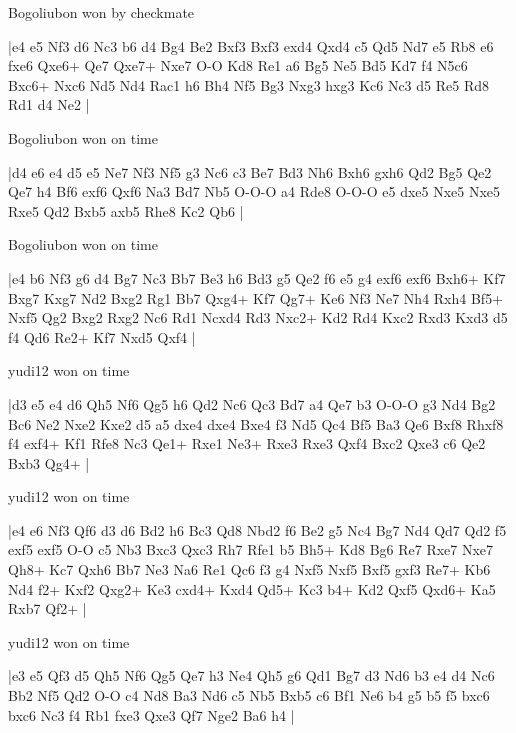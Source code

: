 Bogoliubon won by checkmate

\makegametitle
|e4 e5 Nf3 d6 Nc3 b6 d4 Bg4 Be2 Bxf3 Bxf3 exd4 Qxd4 c5 Qd5 Nd7 e5 Rb8 e6 fxe6 Qxe6+ Qe7 Qxe7+ Nxe7 O-O Kd8 Re1 a6 Bg5 Ne5 Bd5 Kd7 f4 N5c6 Bxc6+ Nxc6 Nd5 Nd4 Rac1 h6 Bh4 Nf5 Bg3 Nxg3 hxg3 Kc6 Nc3 d5 Re5 Rd8 Rd1 d4 Ne2  |

\showboard

Bogoliubon won on time

\makegametitle
|d4 e6 e4 d5 e5 Ne7 Nf3 Nf5 g3 Nc6 c3 Be7 Bd3 Nh6 Bxh6 gxh6 Qd2 Bg5 Qe2 Qe7 h4 Bf6 exf6 Qxf6 Na3 Bd7 Nb5 O-O-O a4 Rde8 O-O-O e5 dxe5 Nxe5 Nxe5 Rxe5 Qd2 Bxb5 axb5 Rhe8 Kc2 Qb6  |

\showboard

Bogoliubon won on time

\makegametitle
|e4 b6 Nf3 g6 d4 Bg7 Nc3 Bb7 Be3 h6 Bd3 g5 Qe2 f6 e5 g4 exf6 exf6 Bxh6+ Kf7 Bxg7 Kxg7 Nd2 Bxg2 Rg1 Bb7 Qxg4+ Kf7 Qg7+ Ke6 Nf3 Ne7 Nh4 Rxh4 Bf5+ Nxf5 Qg2 Bxg2 Rxg2 Nc6 Rd1 Ncxd4 Rd3 Nxc2+ Kd2 Rd4 Kxc2 Rxd3 Kxd3 d5 f4 Qd6 Re2+ Kf7 Nxd5 Qxf4  |

\showboard

yudi12 won on time

\makegametitle
|d3 e5 e4 d6 Qh5 Nf6 Qg5 h6 Qd2 Nc6 Qc3 Bd7 a4 Qe7 b3 O-O-O g3 Nd4 Bg2 Bc6 Ne2 Nxe2 Kxe2 d5 a5 dxe4 dxe4 Bxe4 f3 Nd5 Qc4 Bf5 Ba3 Qe6 Bxf8 Rhxf8 f4 exf4+ Kf1 Rfe8 Nc3 Qe1+ Rxe1 Ne3+ Rxe3 Rxe3 Qxf4 Bxc2 Qxe3 c6 Qe2 Bxb3 Qg4+  |

\showboard

yudi12 won on time

\makegametitle
|e4 e6 Nf3 Qf6 d3 d6 Bd2 h6 Bc3 Qd8 Nbd2 f6 Be2 g5 Nc4 Bg7 Nd4 Qd7 Qd2 f5 exf5 exf5 O-O c5 Nb3 Bxc3 Qxc3 Rh7 Rfe1 b5 Bh5+ Kd8 Bg6 Re7 Rxe7 Nxe7 Qh8+ Kc7 Qxh6 Bb7 Ne3 Na6 Re1 Qc6 f3 g4 Nxf5 Nxf5 Bxf5 gxf3 Re7+ Kb6 Nd4 f2+ Kxf2 Qxg2+ Ke3 cxd4+ Kxd4 Qd5+ Kc3 b4+ Kd2 Qxf5 Qxd6+ Ka5 Rxb7 Qf2+  |

\showboard

yudi12 won on time

\makegametitle
|e3 e5 Qf3 d5 Qh5 Nf6 Qg5 Qe7 h3 Ne4 Qh5 g6 Qd1 Bg7 d3 Nd6 b3 e4 d4 Nc6 Bb2 Nf5 Qd2 O-O c4 Nd8 Ba3 Nd6 c5 Nb5 Bxb5 c6 Bf1 Ne6 b4 g5 b5 f5 bxc6 bxc6 Nc3 f4 Rb1 fxe3 Qxe3 Qf7 Nge2 Ba6 h4  |

